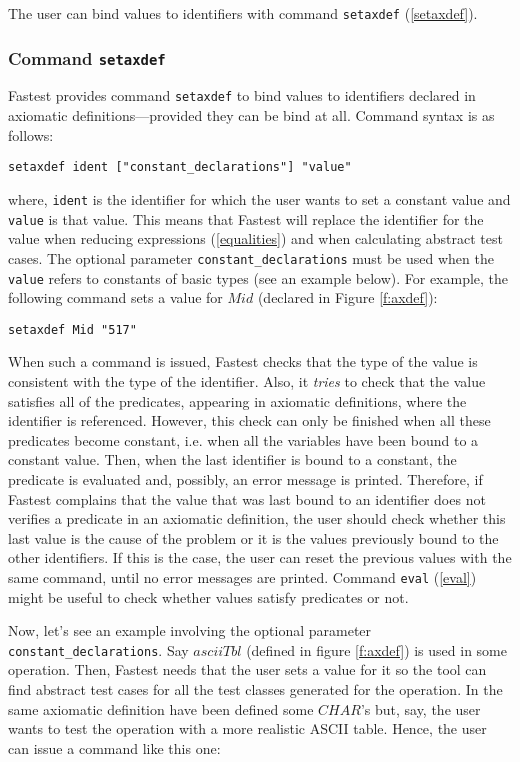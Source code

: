 The user can bind values to identifiers with command \verb+setaxdef+ (\ref{setaxdef}).

\subsubsection{\label{setaxdef}Command {\tt setaxdef}}
Fastest provides command \verb+setaxdef+ to bind values to identifiers declared in axiomatic definitions---provided they can be bind at all. Command syntax is as follows:

\begin{verbatim}
setaxdef ident ["constant_declarations"] "value"
\end{verbatim}

\noindent where, \verb+ident+ is the identifier for which the user wants to set a constant value and \verb+value+ is that value. This means that Fastest will replace the identifier for the value when reducing expressions (\ref{equalities}) and when calculating abstract test cases. The optional parameter \verb+constant_declarations+ must be used when the \verb+value+ refers to constants of basic types (see an example below). For example, the following command sets a value for $Mid$ (declared in Figure \ref{f:axdef}):

\begin{verbatim}
setaxdef Mid "517"
\end{verbatim}

When such a command is issued, Fastest checks that the type of the value is consistent with the type of the identifier. Also, it {\it tries} to check that the value satisfies all of the predicates, appearing in axiomatic definitions, where the identifier is referenced. However, this check can only be finished when all these predicates become constant, i.e. when all the variables have been bound to a constant value. Then, when the last identifier is bound to a constant, the predicate is evaluated and, possibly, an error message is printed. Therefore, if Fastest complains that the value that was last bound to an identifier does not verifies a predicate in an axiomatic definition, the user should check whether this last value is the cause of the problem or it is the values previously bound to the other identifiers. If this is the case, the user can reset the previous values with the same command, until no error messages are printed. Command \verb+eval+ (\ref{eval}) might be useful to check whether values satisfy predicates or not.

Now, let's see an example involving the optional parameter \verb+constant_declarations+. Say $asciiTbl$ (defined in figure \ref{f:axdef}) is used in some operation. Then, Fastest needs that the user sets a value for it so the tool can find abstract test cases for all the test classes generated for the operation. In the same axiomatic definition have been defined some $CHAR$'s but, say, the user wants to test the operation with a more realistic ASCII table. Hence, the user can issue a command like this one:

